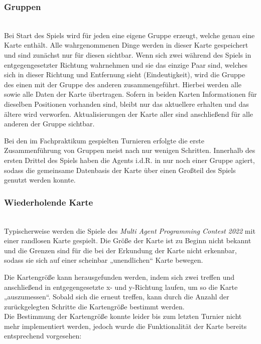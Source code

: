 \subsubsection{Gruppen} ~\\
Bei Start des Spiels wird für jeden \Agent eine eigene Gruppe erzeugt, welche genau eine Karte enthält. Alle wahrgenommenen Dinge werden in dieser Karte gespeichert und sind zunächst nur für diesen \Agent sichtbar. 
Wenn sich zwei \Agents während des Spiels in entgegengesetzter Richtung wahrnehmen und sie das einzige Paar sind, welches sich in dieser Richtung und Entfernung sieht (Eindeutigkeit), wird die Gruppe des einen \Agent mit der Gruppe des anderen \Agent zusammengeführt. Hierbei werden alle \Agents sowie alle Daten der Karte übertragen. Sofern in beiden Karten Informationen für dieselben Positionen vorhanden sind, bleibt nur das aktuellere \NextMapTile erhalten und das ältere wird verworfen. Aktualisierungen der Karte aller \Agents sind anschließend für alle anderen \Agents der Gruppe sichtbar.

Bei den im Fachpraktikum gespielten Turnieren erfolgte die erste Zusammenführung von Gruppen meist nach nur wenigen Schritten. Innerhalb des ersten Drittel des Spiels haben die Agents i.d.R. in nur noch einer Gruppe agiert, sodass die gemeinsame Datenbasis der Karte über einen Großteil des Spiels genutzt werden konnte. 

\subsubsection{Wiederholende Karte} ~\\
Typischerweise werden die Spiele des \textit{Multi Agent Programming Contest 2022} mit einer randlosen Karte gespielt. Die Größe der Karte ist zu Beginn nicht bekannt und die Grenzen sind für die \Agents bei der Erkundung der Karte nicht erkennbar, sodass sie sich auf einer scheinbar „unendlichen“ Karte bewegen.\newline

Die Kartengröße kann herausgefunden werden, indem sich zwei \Agents treffen und anschließend in entgegengesetzte x- und y-Richtung laufen, um so die Karte „auszumessen“. Sobald sich die \Agents erneut treffen, kann durch die Anzahl der zurückgelegten Schritte die Kartengröße bestimmt werden. \\ Die Bestimmung der Kartengröße konnte leider bis zum letzten Turnier nicht mehr implementiert werden, jedoch wurde die Funktionalität der Karte bereits entsprechend vorgesehen: \newline

